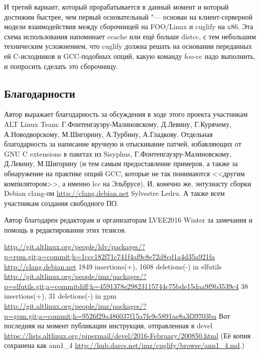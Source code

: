 \documentclass[10pt, a5paper]{article}
\begin{document}
И третий вариант, который прорабатывается в данный момент и который достижим быстрее, чем первый основательный "--- основан на клиент-серверной модели взаимодействия между сборочницей на FOO/Linux и cuglify на x86. Эта схема использования напоминает ccache или ещё больше distcc, с тем небольшим техническим усложнением, что cuglify должна решать на основании переданных ей C-исходников и GCC-подобных опций, какую команду foo-cc надо выполнить, и попросить сделать это сборочницу.

\subsection*{Благодарности}

Автор выражает благодарность за обсуждения в ходе этого проекта участникам ALT Linux Team: Г.Фонтенгауэру-Малиновскому, Д.Левину, Г.Курячему, А.Новодворскому, М.Шигорину, А.Турбину, А.Гладкову. Отдельная благодарность за написание вручную и отыскивание патчей, избавляющих от GNU C extensions в пакетах из Sisyphus, Г.Фонтенгауэру-Малиновскому, Д.Левину, М.Шигорину (и тем самым предоставление примеров, а также за обнаружение на практике опций GCC, которые не так понимаются <<другим компилятором>>, а именно lcc на Эльбрусе). И, конечно же, энтузиасту сборки Debian clang-ом \url{http://clang.debian.net} Sylvestre Ledru. А также всем участникам создания свободного ПО.

Автор благодарен редакторам и организаторам LVEE2016 Winter за замечания и помощь в редактировании этих тезисов.

\begin{thebibliography}{99}

 \url{http://git.altlinux.org/people/ldv/packages/?p=rpm.git;a=commit;h=1ccc182f71c741f4af9c8e72d8cd1a4d35a921fa}
 \url{http://clang.debian.net}
 1849 insertions(+), 1608 deletions(-) in elfutils \url{http://git.altlinux.org/people/imz/packages/?p=elfutils.git;a=commitdiff;h=4591378e29823115744c75bde15daa9f9b3539c4} 
 38 insertions(+), 31 deletions(-) in gpm \url{http://git.altlinux.org/people/imz/packages/?p=gpm.git;a=commit;h=9526f29a486037f15a7fe9c5891ae8a3f39703ba} 
 Вот последняя на момент публикации инструкция, отправленная в devel \url{https://lists.altlinux.org/pipermail/devel/2016-February/200850.html} (Её копия сохранена как ann1\_4 \url{http://hub.darcs.net/imz/cuglify/browse/ann1_4.md}.)
\end{thebibliography}
\end{document}
